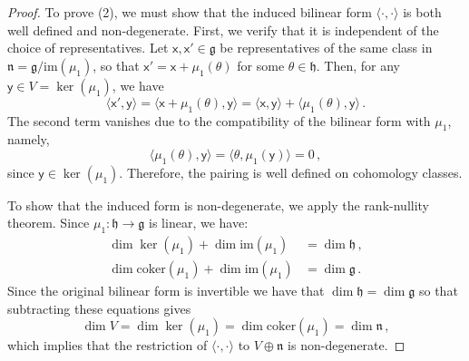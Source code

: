 \documentclass[11pt]{amsart}
\newcommand{\fg}{\mathfrak{g}}
\newcommand{\fn}{\mathfrak{n}}
\newcommand{\fh}{\mathfrak{h}}
\numberwithin{equation}{section}
\numberwithin{figure}{section}
\numberwithin{table}{section}
\theoremstyle{thm}
\numberwithin{equation}{subsection}
\theoremstyle{definition}
\theoremstyle{rem}
\begin{document}
\begin{proof}
To prove (2), we must show that the induced bilinear form \(\langle \cdot,\cdot \rangle\) is both well defined and non-degenerate. First, we verify that it is independent of the choice of representatives. Let \(\mathsf{x}, \mathsf{x}' \in \mathfrak{g}\) be representatives of the same class in \(\mathfrak{n} = \mathfrak{g} / \mathrm{im}(\mu_1)\), so that \(\mathsf{x}' = \mathsf{x} + \mu_1(\theta)\) for some \(\theta \in \mathfrak{h}\). Then, for any \(\mathsf{y} \in V = \ker(\mu_1)\), we have
\begin{equation}
    \langle \mathsf{x}', \mathsf{y} \rangle 
    = \langle \mathsf{x} + \mu_1(\theta), \mathsf{y} \rangle 
    = \langle \mathsf{x}, \mathsf{y} \rangle + \langle \mu_1(\theta), \mathsf{y} \rangle\,.
\end{equation}
The second term vanishes due to the compatibility of the bilinear form with \(\mu_1\), namely,
\begin{equation}
    \langle \mu_1(\theta), \mathsf{y} \rangle = \langle \theta, \mu_1(\mathsf{y}) \rangle = 0\,,
\end{equation}
since \(\mathsf{y} \in \ker(\mu_1)\). Therefore, the pairing is well defined on cohomology classes.

To show that the induced form is non-degenerate, we apply the rank-nullity theorem. Since \(\mu_1 : \mathfrak{h} \to \mathfrak{g}\) is linear, we have:
\begin{align}
    \dim \ker(\mu_1) + \dim \mathrm{im}(\mu_1) &= \dim \mathfrak{h}\,, \\
    \dim \mathrm{coker}(\mu_1) + \dim \mathrm{im}(\mu_1) &= \dim \mathfrak{g}\,.
\end{align}
Since the original bilinear form is invertible we have that $\dim \fh =\dim \fg$ so that subtracting these equations gives
\begin{equation}
   \dim V = \dim \ker(\mu_1) = \dim \mathrm{coker}(\mu_1)=\dim \mathfrak{n}\,,
\end{equation}
which implies that the restriction of $\langle \cdot,\cdot\rangle$ to $V\oplus \fn$ is non-degenerate.







\end{proof}





\printbibliography
\end{document}
